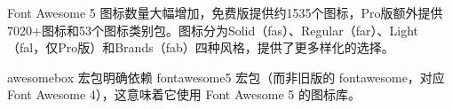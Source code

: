 \documentclass{ctexart}
\begin{document}
\setlength{\aweboxleftmargin}{0.12\linewidth}
\setlength{\aweboxcontentwidth}{0.88\linewidth}

\lipsum[1]

\notebox{\lipsum[2]}

\tipbox{\lipsum[3]}

\warningbox{\lipsum[4]}

\cautionbox{\lipsum[5]}

\importantbox{\lipsum[6]}

\lipsum[7]

Font Awesome 5 图标数量大幅增加，免费版提供约1535个图标，Pro版额外提供7020+图标和53个图标类别包。图标分为Solid（fas）、Regular（far）、Light（fal，仅Pro版）和Brands（fab）四种风格，提供了更多样化的选择。

\begin{importantblock}
  awesomebox 宏包明确依赖 fontawesome5 宏包（而非旧版的 fontawesome，对应 Font Awesome 4），这意味着它使用 Font Awesome 5 的图标库。
\end{importantblock}
\end{document}
